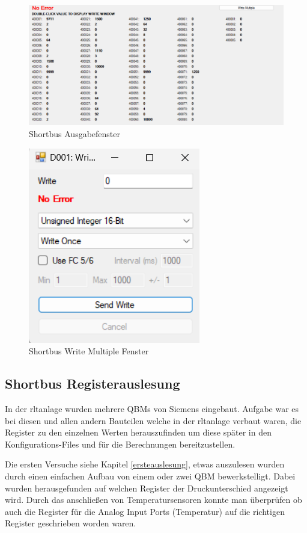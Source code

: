 \begin{figure}[H]
	\centering
	\includegraphics[width=1\linewidth]{Bilder/shortbus_ausgabe}
	\caption{Shortbus Ausgabefenster} 
	\label{fig:Shortbusausgabe}
\end{figure}

\begin{figure}[H]
	\centering
	\includegraphics[width=0.3\linewidth]{Bilder/write_multiple_fenster}
	\caption{Shortbus Write Multiple Fenster} 
	\label{fig:writemultiple}
\end{figure}

\subsection{Shortbus Registerauslesung}

In der \ac{rltanlage} wurden mehrere QBMs von Siemens eingebaut. Aufgabe war es bei diesen und allen andern Bauteilen welche in der \ac{rltanlage} verbaut waren, die Register zu den einzelnen Werten herauszufinden um diese später in den Konfigurations-Files und für die Berechnungen bereitzustellen. 

Die ersten Versuche siehe Kapitel \ref{ersteauslesung}, etwas auszulesen wurden durch einen einfachen Aufbau von einem oder zwei QBM bewerkstelligt. Dabei wurden herausgefunden auf welchen Register der Druckunterschied angezeigt wird. Durch das anschließen von Temperatursensoren konnte man überprüfen ob auch die Register für die Analog Input Ports (Temperatur) auf die richtigen Register geschrieben worden waren.


